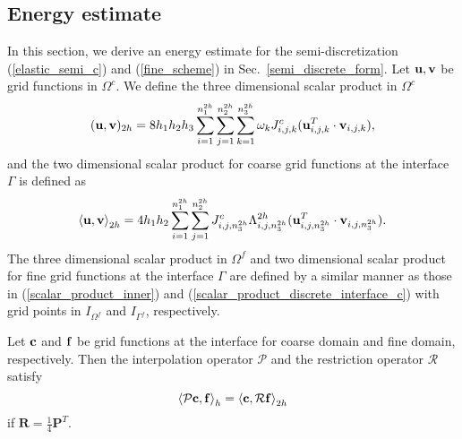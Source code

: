 \subsection{Energy estimate}\label{sec_energy}
In this section, we derive an energy estimate for the semi-discretization (\ref{elastic_semi_c}) and (\ref{fine_scheme}) in Sec.~\ref{semi_discrete_form}. Let ${\bf u}, {\bf v}$ be grid functions in $\Omega^c$. We define the three dimensional scalar product in $\Omega^c$
\begin{equation}\label{scalar_product_inner}
({\bf u}, {\bf v})_{2h} = 8h_1h_2h_3\sum_{i=1}^{n_1^{2h}}\sum_{j=1}^{n_2^{2h}}\sum_{k=1}^{n_3^{2h}}\omega_k{J}_{i,j,k}^{c}({\bf u}_{i,j,k}^T\cdot {\bf v}_{i,j,k}),
\end{equation}
and the two dimensional scalar product for coarse grid functions at the interface $\Gamma$ is defined as 
\begin{equation}\label{scalar_product_discrete_interface_c}
\left<{\bf u}, {\bf v}\right>_{2h} = 4h_1h_2\sum_{i=1}^{n_1^{2h}}\sum_{j=1}^{n_2^{2h}}{  J}_{i,j,n_3^{2h}}^{c}\Lambda^{2h}_{i,j,n_3^{2h}}({\bf u}_{i,j,n_3^{2h}}^T\cdot {\bf v}_{i,j,n_3^{2h}}).
\end{equation}
The three dimensional scalar product in $\Omega^f$ and two dimensional scalar product for fine grid functions at the interface $\Gamma$ are defined by a similar manner as those in (\ref{scalar_product_inner}) and (\ref{scalar_product_discrete_interface_c}) with grid points in $I_{\Omega^f}$ and $I_{\Gamma^f}$, respectively. 
\begin{lemma}\label{lemma1}
 Let ${\bf c}$ and ${\bf f}$ be grid functions at the interface for coarse domain and fine domain, respectively. Then the interpolation operator $\mathcal{P}$ and the restriction operator $\mathcal{R}$ satisfy
 \begin{equation}\label{pr_relation}
 \left<\mathcal{P} {\bf c}, {\bf f}\right>_h = \left<{\bf c}, \mathcal{R}{\bf f}\right>_{2h}
 \end{equation}
 if $\bm{R} = \frac{1}{4}\bm{P}^T$. 
\end{lemma}
